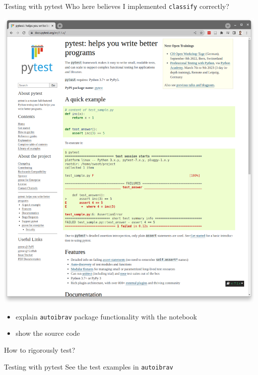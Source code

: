 \documentclass[xcolor=table,aspectratio=169]{beamer}
\numberwithin{equation}{section}
\begin{document}
\begin{frame}{Testing with pytest}
  Who here believes I implemented \texttt{classify} correctly?

  \includegraphics[width=\textwidth]{figures/pytest.png}
  \begin{itemize}
    \item explain \texttt{autoibrav} package functionality with the notebook
    \item show the source code
  \end{itemize}

  How to rigorously test?

\end{frame}

\begin{frame}{Testing with pytest}
  See the test examples in \texttt{autoibrav}
\end{frame}
\end{document}
